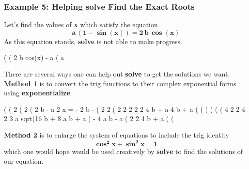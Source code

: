 \documentclass[11pt]{article}
\begin{document}
\subsubsection*{Example 5: Helping \textbf{solve} Find the Exact Roots}
Let's find the values of \textbf{x} which satisfy the equation 
\begin{equation}
\mathbf{a\,( 1 - \boldsymbol{\sin}(x) ) = 2 \, b\, \boldsymbol{\cos}(x) }
\end{equation}
As this equation stands, \textbf{solve} is not able to make progress.
\begin{myVerbatim}
(%
(%
                                      2 b cos(x) - a
(%
                                            a
\end{myVerbatim}
\newpage
\noindent There are several ways one can help out \textbf{solve} to get the solutions we want.\\

\noindent \textbf{Method 1} is to convert the trig functions to their complex exponential forms
  using \textbf{exponentialize}.
\begin{myVerbatim}
(%
(%
                       2
(%
                      2 %
(%
                    2 b - %
                                                          a          2 %
                                         x = - %
                                                      2 b - %
(%
                                          2    2
(%
                       2                  2    2     2    2
                                       4 b  + a   4 b  + a
(%
(%
(%
(%
(%
(%
                            4      2  2    4         2    3
                 a sqrt(16 b  + 8 a  b  + a ) - 4 a b  - a
(%
                                    2    2
                                 4 b  + a
(%
(%
\end{myVerbatim}
\textbf{Method 2} is to enlarge the system of equations to include the trig identity
\begin{equation}
\mathbf{ \boldsymbol{\cos}^{2} x + \boldsymbol{\sin}^{2} x = 1 }
\end{equation}  
  which one would hope would be used creatively by \textbf{solve} to find the
  solutions of our equation.\\
  
\end{document}
